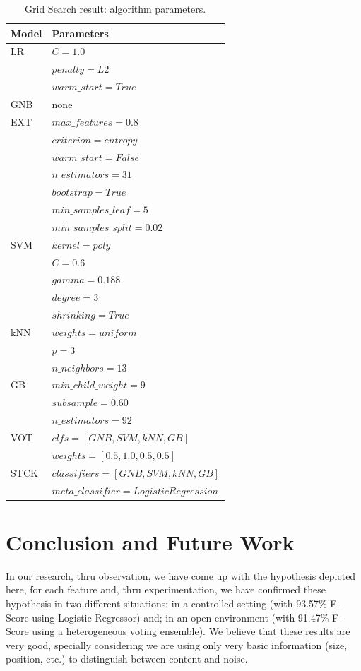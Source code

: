 \begin{table}[h]
\centering
\caption{Grid Search result: algorithm parameters.}
\label{tab:params}
\begin{tabular}{| l | l |}
\hline
Model & Parameters \\ \hline 
LR        & $C=1.0$ \\ 
          & $penalty=L2$ \\
          & $warm\_start=True$ \\ \hline
GNB       & none \\ \hline
EXT       & $max\_features=0.8$ \\ 
          & $criterion=entropy$ \\
          & $warm\_start=False$ \\
          & $n\_estimators=31$ \\
          & $bootstrap=True$ \\
          & $min\_samples\_leaf=5$ \\ 
          & $min\_samples\_split=0.02$ \\ \hline
SVM       & $kernel=poly$ \\
          & $C=0.6$ \\
          & $gamma=0.188$ \\ 
          & $degree=3$ \\
          & $shrinking=True$ \\ \hline
kNN       & $weights=uniform$ \\
          & $p=3$ \\
          & $n\_neighbors=13$ \\ \hline
GB        & $min\_child\_weight=9 $ \\
          & $subsample=0.60$ \\ 
          & $n\_estimators=92$ \\ \hline
VOT       & $clfs=[GNB, SVM, kNN, GB]$ \\
          & $weights=[0.5, 1.0, 0.5, 0.5]$ \\ \hline
STCK      & $classifiers=[GNB, SVM, kNN, GB]$ \\
          & $meta\_classifier=LogisticRegression$ \\          
\hline
\end{tabular}
\end{table}

\section{Conclusion and Future Work}\label{sec:con}
In our research, thru observation, we have come up with the hypothesis depicted
here, for each feature and, thru experimentation, we have confirmed these
hypothesis in two different situations:
in a controlled setting (with 93.57\% F-Score using Logistic Regressor) and; in
an open environment (with 91.47\% F-Score using a heterogeneous voting
ensemble). We believe that these results are very good, specially
considering we are using only very basic information (size, position, etc.) to
distinguish between content and noise.


